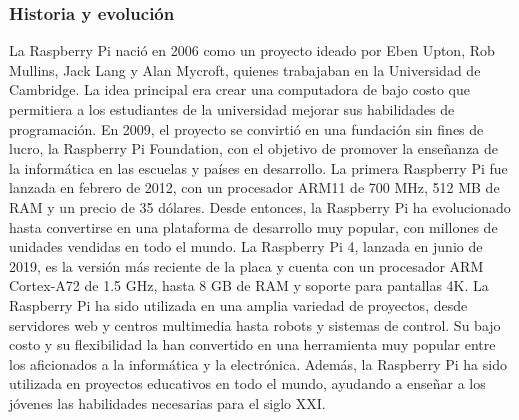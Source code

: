 \subsubsection{Historia y evoluci\'on}
    \label{subsubsection:historiaEvolucion}
    La Raspberry Pi naci\'o en 2006 como un proyecto ideado por Eben Upton, Rob Mullins, Jack Lang y Alan Mycroft, 
        quienes trabajaban en la Universidad de Cambridge. La idea principal era crear una computadora de bajo costo 
        que permitiera a los estudiantes de la universidad mejorar sus habilidades de programaci\'on. \cite{Santamaria2023}
        En 2009, el proyecto se convirti\'o en una fundaci\'on sin fines de lucro, la Raspberry Pi Foundation, 
        con el objetivo de promover la ense\~nanza de la inform\'atica en las escuelas y pa\'ises en desarrollo. \cite{Santamaria2023}
    \vskip 0.5cm
    La primera Raspberry Pi fue lanzada en febrero de 2012, con un procesador ARM11 de 700 MHz, 512 MB de RAM y 
        un precio de 35 d\'olares. Desde entonces, la Raspberry Pi ha evolucionado hasta convertirse en una 
        plataforma de desarrollo muy popular, con millones de unidades vendidas en todo el mundo.\cite{Santamaria2023}
        La Raspberry Pi 4, lanzada en junio de 2019, es la versi\'on m\'as reciente de la placa y cuenta con un 
        procesador ARM Cortex-A72 de 1.5 GHz, hasta 8 GB de RAM y soporte para pantallas 4K. \cite{Santamaria2023}
    \vskip 0.5cm
    La Raspberry Pi ha sido utilizada en una amplia variedad de proyectos, desde servidores web y centros multimedia 
        hasta robots y sistemas de control. Su bajo costo y su flexibilidad la han convertido en una herramienta 
        muy popular entre los aficionados a la inform\'atica y la electr\'onica. Adem\'as, la Raspberry Pi ha sido 
        utilizada en proyectos educativos en todo el mundo, ayudando a ense\~nar a los j\'ovenes las habilidades 
        necesarias para el siglo XXI.
